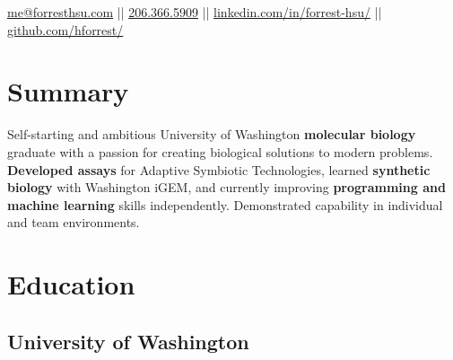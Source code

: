 \documentclass[]{forrest-resume-interfont}
\begin{document}
%
%

\lastupdated

%
%


%
%

{
	\href{mailto:me@forresthsu.com}{me@forresthsu.com} || 
	\href{tel:2063665909}{206.366.5909} || 
	\href{https://www.linkedin.com/in/forrest-hsu/}{linkedin.com/in/forrest-hsu/} ||
	\href{https://github.com/HForrest/}{github.com/hforrest/}
}

%
%
\spacesep
\section{ Summary}
\raggedright 

Self-starting and ambitious University of Washington \textbf{molecular biology} graduate with a passion for creating biological solutions to modern problems. \textbf{Developed assays} for Adaptive Symbiotic Technologies, learned \textbf{synthetic biology} with Washington iGEM, and currently improving \textbf{programming and machine learning} skills independently. Demonstrated capability in individual and team environments.

\linesep


\section{ Education}
\subsection{University of Washington}
\spacesep
\end{document}
